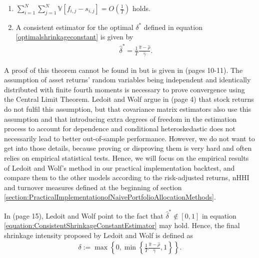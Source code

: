 \begin{theorem}
\begin{enumerate}
        	    \item $\sum_{i=1}^N \sum_{j=1}^N \mathbb{V}[f_{i,j} - s_{i,j}] = O \left( \frac{1}{T} \right)$ holds.
        	    
        	    \item A consistent estimator for the optimal $\delta^*$ defined in equation \ref{optimalshrinkageconstant} is given by
        	    \begin{align}\label{equation:ConsistentShrinkageConstantEstimator}
        	        \hat{\delta}^* = \frac{1}{T} \frac{\hat{\pi} - \hat{\rho}}{\hat{\gamma}}.
        	    \end{align}
        	    \end{enumerate}
    	\end{theorem}
    	
    	A proof of this theorem cannot be found in \cite{ledoit} but is given in \cite{ledoit2003} (pages 10-11). The assumption of asset returns' random variables being independent and identically distributed with finite fourth moments is necessary to prove convergence using the Central Limit Theorem. Ledoit and Wolf argue in \cite{ledoit2003} (page 4) that stock returns do not fulfil this assumption, but that covariance matrix estimators also use this assumption and that introducing extra degrees of freedom in the estimation process to account for dependence and conditional heteroskedastic does not necessarily lead to better out-of-sample performance. However, we do not want to get into those details, because proving or disproving them is very hard and often relies on empirical statistical tests. Hence, we will focus on the empirical results of Ledoit and Wolf's method in our practical implementation backtest, and compare them to the other models according to the risk-adjusted returns, nHHI and turnover measures defined at the beginning of section \ref{section:PracticalImplementationofNaivePortfolioAllocationMethods}.
    	
    	In \cite{ledoit} (page 15), Ledoit and Wolf point to the fact that $\hat{\delta}^* \notin [0,1]$ in equation \ref{equation:ConsistentShrinkageConstantEstimator} may hold. Hence, the final shrinkage intensity proposed by Ledoit and Wolf is defined as
    	\begin{align}\label{equation:FlooredCappedConsistentShrinkageConstantEstimator}
    	    \delta := \max \left\{ 0, \min \left\{ \frac{1}{T} \frac{\hat{\pi} - \hat{\rho}}{\hat{\gamma}}, 1 \right\} \right\}.
    	\end{align}
    	
